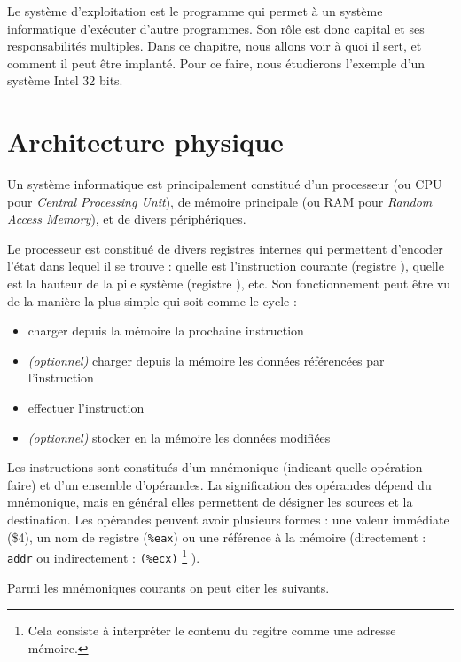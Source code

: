 Le système d'exploitation est le programme qui permet à un système informatique
d'exécuter d'autre programmes. Son rôle est donc capital et ses responsabilités
multiples. Dans ce chapitre, nous allons voir à quoi il sert, et comment il peut
être implanté. Pour ce faire, nous étudierons l'exemple d'un système Intel
32 bits.

\section{Architecture physique}

Un système informatique est principalement constitué d'un processeur (ou CPU
pour \emph{Central Processing Unit}), de mémoire principale (ou RAM pour
\emph{Random Access Memory}), et de divers périphériques.

Le processeur est constitué de divers registres internes qui permettent
d'encoder l'état dans lequel il se trouve : quelle est l'instruction courante
(registre \eip), quelle est la hauteur de la pile système (registre \esp), etc.
Son fonctionnement peut être vu de la manière la plus simple qui soit comme le
cycle :

\begin{itemize}
\item
  charger depuis la mémoire la prochaine instruction
\item
  \emph{(optionnel)} charger depuis la mémoire les données référencées
  par l'instruction
\item
  effectuer l'instruction
\item
  \emph{(optionnel)} stocker en la mémoire les données modifiées
\end{itemize}

Les instructions sont constitués d'un mnémonique (indicant quelle opération
faire) et d'un ensemble d'opérandes. La signification des opérandes dépend du
mnémonique, mais en général elles permettent de désigner les sources et la
destination. Les opérandes peuvent avoir plusieurs formes : une valeur
immédiate (\$4), un nom de registre (\texttt{\%eax}) ou une référence à la
mémoire (directement : \texttt{addr} ou indirectement : \texttt{(\%ecx)}
\footnote{
  Cela consiste à interpréter le contenu du regitre \ecx comme une adresse
  mémoire.
}
).

Parmi les mnémoniques courants on peut citer les suivants.

